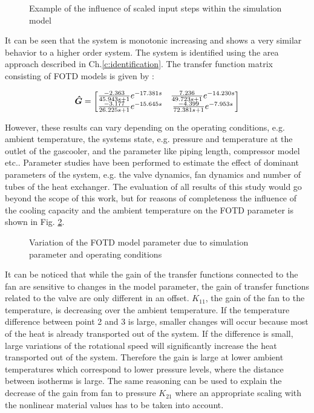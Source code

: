 \begin{figure}[H]

\caption{Example of the influence of scaled input steps within the simulation model}
\label{c:physical:f:identification_example}
\end{figure}

It can be seen that the system is monotonic increasing and shows a very similar behavior to a higher order system. The system is identified using the area approach described in Ch.\ref{c:identification}. The transfer function matrix consisting of FOTD models is given by :

\begin{align*}
\mbox{\boldmath$\hat{G}$} = \begin{bmatrix}
\frac{-2.363}{45.943s+1}e^{-17.381s} & 
\frac{7.236}{49.723s+1}e^{-14.230s} \\
\frac{-3.177}{26.225s+1}e^{-15.645s} &
\frac{-4.399}{72.381s+1}e^{-7.953s}
\end{bmatrix}
\end{align*}

However, these results can vary depending on the operating conditions, e.g. ambient temperature, the systems state, e.g. pressure and temperature at the outlet of the gascooler, and the parameter like piping length, compressor model etc.. Parameter studies have been performed to estimate the effect of dominant parameters of the system, e.g. the valve dynamics, fan dynamics and number of tubes of the heat exchanger. The evaluation of all results of this study would go beyond the scope of this work, but for reasons of completeness the influence of the cooling capacity and the ambient temperature on the FOTD parameter is shown in Fig. \ref{c:physical:f:parameter_variation}.

\begin{figure}[H]

\caption{Variation of the FOTD model parameter due to simulation parameter and operating conditions}
\label{c:physical:f:parameter_variation}
\end{figure}

It can be noticed that while the gain of the transfer functions connected to the fan are sensitive to changes in the model parameter, the gain of transfer functions related to the valve are only different in an offset. $K_{11}$, the gain of the fan to the temperature, is decreasing over the ambient temperature. If the temperature difference between point 2 and 3 is large, smaller changes will occur because most of the heat is already transported out of the system. If the difference is small, large variations of the rotational speed will significantly increase the heat transported out of the system. Therefore the gain is large at lower ambient temperatures which correspond to lower pressure levels, where the distance between isotherms is large. The same reasoning can be used to explain the decrease of the gain from fan to pressure $K_{21}$ where an appropriate scaling with the nonlinear material values has to be taken into account.\\

